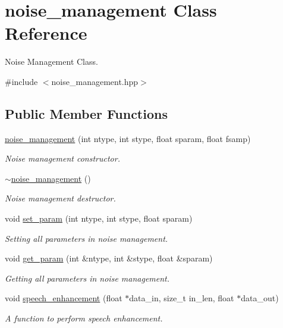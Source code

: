 \hypertarget{classnoise__management}{}\section{noise\+\_\+management Class Reference}
\label{classnoise__management}


Noise Management Class.  




{\ttfamily \#include $<$noise\+\_\+management.\+hpp$>$}

\subsection*{Public Member Functions}
\begin{DoxyCompactItemize}
\item 
\hyperlink{classnoise__management_a2285f3bb163f38f773cf5d6ccbd6022e}{noise\+\_\+management} (int ntype, int stype, float sparam, float fsamp)
\begin{DoxyCompactList}\small\item\em Noise management constructor. \end{DoxyCompactList}\item 
\mbox{\label{classnoise__management_a9a0a09f3048e97a98d3278e233096530}} 
\hyperlink{classnoise__management_a9a0a09f3048e97a98d3278e233096530}{$\sim$noise\+\_\+management} ()
\begin{DoxyCompactList}\small\item\em Noise management destructor. \end{DoxyCompactList}\item 
void \hyperlink{classnoise__management_a50d6db52a6a83aef67e42c4a9f879cc5}{set\+\_\+param} (int ntype, int stype, float sparam)
\begin{DoxyCompactList}\small\item\em Setting all parameters in noise management. \end{DoxyCompactList}\item 
void \hyperlink{classnoise__management_af5fe32222b7fe86d4ec3222e2f60ede7}{get\+\_\+param} (int \&ntype, int \&stype, float \&sparam)
\begin{DoxyCompactList}\small\item\em Getting all parameters in noise management. \end{DoxyCompactList}\item 
void \hyperlink{classnoise__management_aa73425faa4f2434bf26a27c7068bbd1a}{speech\+\_\+enhancement} (float $\ast$data\+\_\+in, size\+\_\+t in\+\_\+len, float $\ast$data\+\_\+out)
\begin{DoxyCompactList}\small\item\em A function to perform speech enhancement. \end{DoxyCompactList}\end{DoxyCompactItemize}


